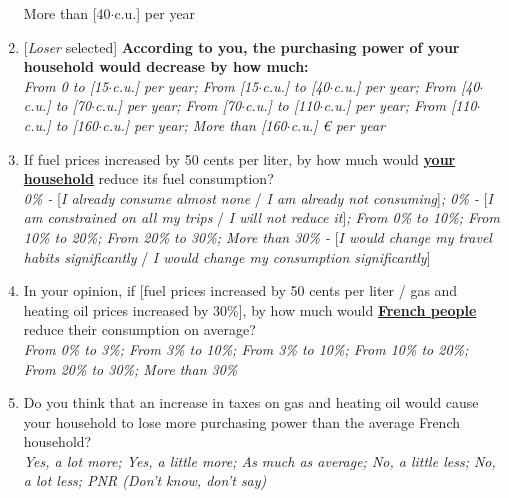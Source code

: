 \documentclass[12pt]{article} %
\begin{document}
\begin{appendices}
\begin{enumerate}[resume,leftmargin=*]
{More than {[}40$\cdot$c.u.{]} \euros{} per year}
\item {[}\emph{Loser} selected{]} \textbf{According to you, the purchasing
power of your household would decrease by how much:} \emph{}\\
\emph{From 0 to {[}15$\cdot$c.u.{]} \euros{} per year; From {[}15$\cdot$c.u.{]}
to {[}40$\cdot$c.u.{]} \euros{} per year; From {[}40$\cdot$c.u.{]} to {[}70$\cdot$c.u.{]}
\euros{} per year; From {[}70$\cdot$c.u.{]} to {[}110$\cdot$c.u.{]} \euros{} per year;
From {[}110$\cdot$c.u.{]} to {[}160$\cdot$c.u.{]} \euros{} per year; More
than {[}160$\cdot$c.u.{]} \euro{} per year}
\item If fuel prices increased by 50 cents per liter, by how much would
\textbf{\underline{your household}} reduce its fuel consumption? \emph{}\\
\emph{0\% -} {[}\emph{I already consume almost none }/\emph{ I am
already not consuming}{]}\emph{; 0\% - }{[}\emph{I am constrained
on all my trips} / \emph{I will not reduce it}{]}\emph{; From 0\%
to 10\%; From 10\% to 20\%; From 20\% to 30\%; More than 30\% - }{[}\emph{I
would change my travel habits significantly }/ \emph{I would change
my consumption significantly}{]}
\item In your opinion, if {[}fuel prices increased by 50 cents per liter
/ gas and heating oil prices increased by 30\%{]}, by how much would
\textbf{\underline{French people}} reduce their consumption on average?
\emph{}\\
\emph{From 0\% to 3\%; From 3\% to 10\%; From 3\% to 10\%; From 10\%
to 20\%; From 20\% to 30\%; More than 30\%} 
\item Do you think that an increase in taxes on gas and heating oil would cause your household to lose more purchasing power than the average French household?\\
\emph{Yes, a lot more; Yes, a little more; As much as average; No, a little less; No, a lot less; PNR (Don't know, don't say)} %
\end{enumerate}


\end{appendices}
\end{document}
